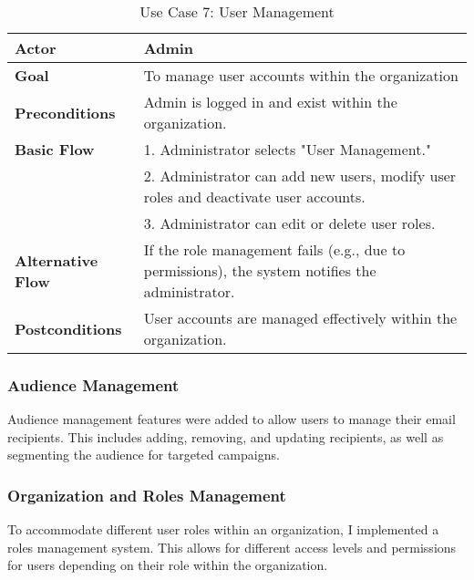 \begin{table}[ht]
	\centering
	\begin{tabularx}{\textwidth}{|l|X|}
		\hline
		\textbf{Actor}            & Admin                                                                               \\
		\hline
		\textbf{Goal}             & To manage user accounts within the organization                                     \\
		\hline
		\textbf{Preconditions}    & Admin is logged in and exist within the organization.                               \\
		\hline
		\textbf{Basic Flow}       & 1. Administrator selects "User Management."                                         \\
		                          & 2. Administrator can add new users, modify user roles and deactivate user accounts. \\
		                          & 3. Administrator can edit or delete user roles.                                     \\
		\hline
		\textbf{Alternative Flow} &
		If the role management fails (e.g., due to permissions), the system notifies the administrator.                 \\
		\hline
		\textbf{Postconditions}   & User accounts are managed effectively within the organization.                      \\
		\hline
	\end{tabularx}
	\caption{Use Case 7: User Management}
	\label{tab:Use Case 7 User Management}
\end{table}

\subsubsection{Audience Management}

Audience management features were added to allow users to manage their email recipients. This includes adding, removing, and updating recipients, as well as segmenting the audience for targeted campaigns.

\subsubsection{Organization and Roles Management}

To accommodate different user roles within an organization, I implemented a roles management system. This allows for different access levels and permissions for users depending on their role within the organization.